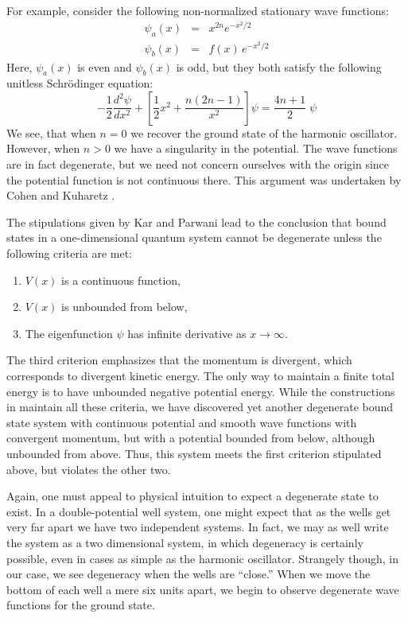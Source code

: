 \documentclass[12pt]{article}
\begin{document}
\par For example, consider the following non-normalized stationary wave functions:
\begin{eqnarray}
\psi_a(x) &=&x^{2n}e^{-x^2/2}\\
 \psi_b(x) &=& f(x)\,e^{-x^2/2}
\end{eqnarray}
Here, $\psi_a(x)$ is even and $\psi_b(x)$ is odd, but they both satisfy the following unitless Schr\"{o}dinger equation:
\begin{equation}
-\frac{1}{2}\frac{d^2\psi}{dx^2}+\left[\frac{1}{2}x^2+\frac{n(2n-1)}{x^2}\right]\psi=\frac{4n+1}{2}\;\psi
\end{equation}
We see, that when $n=0$ we recover the ground state of the harmonic oscillator. However, when $n>0$ we have a singularity in the potential. The wave functions are in fact degenerate, but we need not concern ourselves with the origin since the potential function is not continuous there. This argument was undertaken by Cohen and Kuharetz \cite{Cohen-Kuharetz}.

\par The stipulations given by Kar and Parwani \cite{Kar-Parwani} lead to the conclusion that bound states in a one-dimensional quantum system cannot be degenerate unless the following criteria are met:
\begin{enumerate}
\item $V(x)$ is a continuous function,
\item $V(x)$ is unbounded from below,
\item The eigenfunction $\psi$ has infinite derivative as $x\rightarrow \infty$.
\end{enumerate}
The third criterion emphasizes that the momentum is divergent, which corresponds to divergent kinetic energy. The only way to maintain a finite total energy is to have unbounded negative potential energy. While the constructions in \cite{Kar-Parwani} maintain all these criteria, we have discovered yet another degenerate bound state system with continuous potential and smooth wave functions with convergent momentum, but with a potential bounded from below, although unbounded from above. Thus, this system meets the first criterion stipulated above, but violates the other two. 

\par Again, one must appeal to physical intuition to expect a degenerate state to exist. In a double-potential well system, one might expect that as the wells get very far apart we have two independent systems. In fact, we may as well write the system as a two dimensional system, in which degeneracy is certainly possible, even in cases as simple as the harmonic oscillator. Strangely though, in our case, we see degeneracy when the wells are ``close.''  When we move the bottom of each well a mere six units apart, we begin to observe degenerate wave functions for the ground state. 
\end{document}

